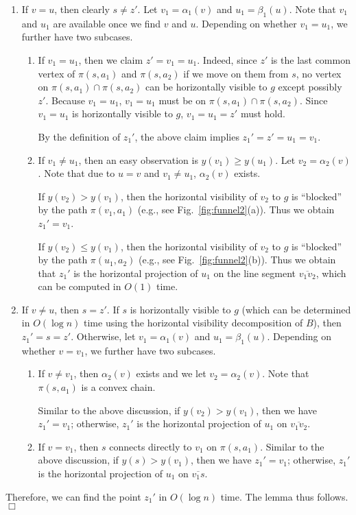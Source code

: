 \documentclass[english,runningheads,11pt]{llncs}
\newenvironment{proof}{\noindent {\textbf{Proof:}}\rm}{\hfill $\Box$\rm}
\begin{document}
\begin{proof}
\begin{enumerate}
\item
If $v=u$, then clearly $s\neq z'$. Let $v_1=\alpha_1(v)$ and $u_1=\beta_1(u)$. Note that $v_1$
and $u_1$ are available once we find $v$ and $u$. Depending on whether $v_1=u_1$, we further have two subcases.

\begin{enumerate}
\item If $v_1=u_1$, then we claim $z'=v_1=u_1$. Indeed, since $z'$ is the last common vertex
of $\pi(s,a_1)$ and $\pi(s,a_2)$ if we move on them from $s$, no vertex on
$\pi(s,a_1)\cap \pi(s,a_2)$ can be horizontally visible to $g$ except possibly $z'$.
Because $v_1=u_1$, $v_1=u_1$ must be on $\pi(s,a_1)\cap \pi(s,a_2)$. Since $v_1=u_1$ is
horizontally visible to $g$, $v_1=u_1=z'$ must hold.

    By the definition of $z_1'$, the above claim implies $z_1'=z'=u_1=v_1$.

\item If $v_1\neq u_1$, then an easy observation is $y(v_1)\geq y(u_1)$. Let $v_2=\alpha_2(v)$. Note that due to $u=v$ and $v_1\neq u_1$, $\alpha_2(v)$ exists.

    If $y(v_2)>y(v_1)$, then the horizontal visibility of $v_2$ to $g$ is ``blocked'' by the
path $\pi(v_1,a_1)$ (e.g., see Fig.~\ref{fig:funnel2}(a)). Thus we obtain $z_1'=v_1$.

    If $y(v_2)\leq y(v_1)$, then the horizontal visibility of $v_2$ to $g$ is ``blocked'' by
the path $\pi(u_1,a_2)$ (e.g., see Fig.~\ref{fig:funnel2}(b)). Thus we obtain that $z_1'$ is
the horizontal projection of $u_1$ on the line segment $\overline{v_1v_2}$, which can be computed in $O(1)$ time.
\end{enumerate}

\item
If $v\neq u$, then $s=z'$.
If $s$ is horizontally visible to $g$ (which can be determined in $O(\log n)$ time
using the horizontal visibility decomposition of $B$), then $z_1'=s=z'$.  Otherwise,
let $v_1=\alpha_1(v)$ and $u_1=\beta_1(u)$. Depending on whether $v=v_1$, we further have two subcases.

\begin{enumerate}
\item If $v\neq v_1$, then $\alpha_2(v)$ exists and we let $v_2=\alpha_2(v)$.
Note that $\pi(s,a_1)$ is a convex chain.


    Similar to the above discussion, if $y(v_2)>y(v_1)$, then we have $z_1'=v_1$; otherwise, $z_1'$ is the horizontal projection of $u_1$ on $\overline{v_1v_2}$.

\item
If $v=v_1$, then $s$ connects directly to $v_1$ on $\pi(s,a_1)$.
Similar to the above discussion, if $y(s)>y(v_1)$, then we have $z_1'=v_1$; otherwise, $z_1'$ is the horizontal projection of $u_1$ on $\overline{v_1s}$.
\end{enumerate}
\end{enumerate}

Therefore, we can find the point $z_1'$ in $O(\log n)$ time. The lemma thus follows.
\end{proof}
\end{document}

